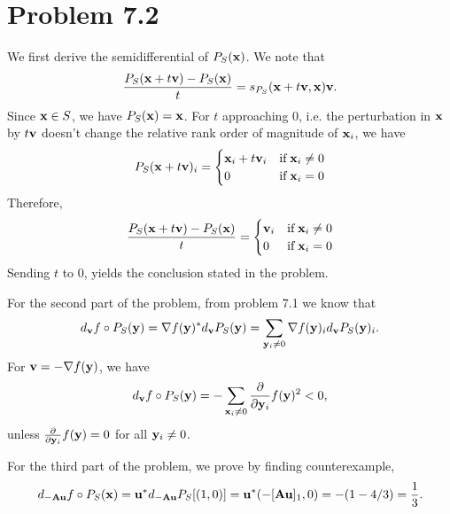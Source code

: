 \documentclass{scrartcl}
\begin{document}
\section*{Problem 7.2}

We first derive the semidifferential of $P_S(\mathbf{x})$. We note that
\begin{equation}
\begin{split}
{{ P_S(\mathbf{x}+t\mathbf{v}) - P_S(\mathbf{x}) } \over t} = s_{P_S}(\mathbf{x}+t\mathbf{v}, \mathbf{x})\mathbf{v}.
\end{split}
\end{equation}
Since $\mathbf{x} \in S$, we have $P_S(\mathbf{x}) = \mathbf{x}$. For $t$ approaching 0, i.e. the perturbation in $\mathbf{x}$ by $t\mathbf{v}$ doesn't change the relative rank order
of magnitude of $\mathbf{x}_i$, we have
\begin{equation}
P_S(\mathbf{x}+t\mathbf{v})_i = \begin{cases}
                            \mathbf{x}_i + t\mathbf{v}_i & \text{if\;} \mathbf{x}_i \neq 0 \\
                            0                    & \text{if\;} \mathbf{x}_i = 0
                        \end{cases}
\end{equation}
Therefore,
\begin{equation}
{{ P_S(\mathbf{x}+t\mathbf{v}) - P_S(\mathbf{x}) } \over t} =
\begin{cases}
    \mathbf{v}_i & \text{if\;} \mathbf{x}_i \neq 0 \\
    0        & \text{if\;} \mathbf{x}_i = 0
\end{cases}
\end{equation}
Sending $t$ to 0, yields the conclusion stated in the problem.

For the second part of the problem, from problem 7.1 we know that
\begin{equation}
    d_{\mathbf{v}} f \circ P_S(\mathbf{y}) = \nabla f(\mathbf{y})^* d_{\mathbf{v}}P_S(\mathbf{y}) = \sum_{\mathbf{y}_i \neq 0} \nabla f(\mathbf{y})_i d_{\mathbf{v}}P_S(\mathbf{y})_i.
\end{equation}
For $\mathbf{v} = -\nabla f(\mathbf{y})$, we have
\begin{equation}
    d_{\mathbf{v}} f \circ P_S(\mathbf{y}) = -\sum_{\mathbf{x}_i \neq 0} {\partial \over {\partial \mathbf{y}_i}} f(\mathbf{y})^2 < 0,
\end{equation}
unless ${\partial \over {\partial \mathbf{y}_i}} f(\mathbf{y}) = 0$ for all $\mathbf{y}_i \neq 0$.

For the third part of the problem, we prove by finding counterexample,
\begin{equation}
d_{-\mathbf{A}\mathbf{u}} f \circ P_S(\mathbf{x}) = \mathbf{u}^* d_{-\mathbf{A}\mathbf{u}}P_S[(1,0)] = \mathbf{u}^*(-[\mathbf{A}\mathbf{u}]_1, 0) = -(1- 4/3) = {1 \over 3}.
\end{equation}
\end{document}
